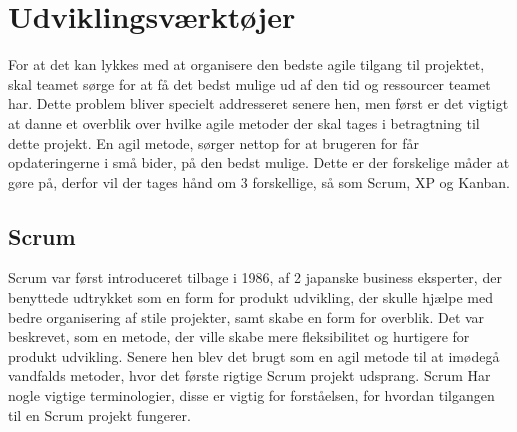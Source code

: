 
\chapter{Udviklingsværktøjer}\label{ch:udviklingsværktøjer}

For at det kan lykkes med at organisere den bedste agile tilgang til projektet, skal teamet sørge for at få det bedst mulige ud af den tid og ressourcer teamet har. Dette problem bliver specielt addresseret senere hen, men først er det vigtigt at danne et overblik over hvilke agile metoder der skal tages i betragtning til dette projekt. En agil metode, sørger nettop for at brugeren for får opdateringerne i små bider, på den bedst mulige. Dette er der forskelige måder at gøre på, derfor vil der tages hånd om 3 forskellige, så som Scrum, XP og Kanban. 

\section{Scrum}


Scrum var først introduceret tilbage i 1986, af 2 japanske business eksperter, der benyttede udtrykket som en form for produkt udvikling, der skulle hjælpe med bedre organisering af stile projekter, samt skabe en form for overblik. Det var beskrevet, som en metode, der ville skabe mere fleksibilitet og hurtigere for produkt udvikling. Senere hen blev det brugt som en agil metode til at imødegå vandfalds metoder, hvor det første rigtige Scrum projekt udsprang. \cite{ScrumHistory}  Scrum Har nogle vigtige terminologier, disse er vigtig for forståelsen, for hvordan tilgangen til en Scrum projekt fungerer. 


